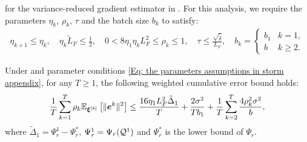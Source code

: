 for the variance-reduced gradient estimator in .
For this analysis, we require the parameters $\eta_{k}$, $\rho_{k}$, $\tau$ 
and the batch size $b_k$ to satisfy:
\begin{align}
    \label{Eq: the parameters assumptions in storm appendix}
    \eta_{k+1}\leq \eta_{k}, \quad \eta_{k}\tilde{L}_{F}\leq \frac{1}{2}, \quad 
    0 < 8\eta_{1}\eta_{k}L_{F}^{2}\leq \rho_{k}\leq1, \quad 
    \tau \leq \frac{\sqrt{\tilde{\delta}}}{L_{F}}, \quad
    b_k = \begin{cases} b_1 & k = 1, \\ b & k \geq 2. \end{cases}
\end{align}
\begin{lemma}
    \label{Lemma: Weighted error accumulation} Under 
    and parameter conditions \eqref{Eq: the parameters assumptions in storm appendix}, for any $T \geq 1$, the following weighted cumulative error bound
    holds:
    \begin{align}
        \label{Eq: weighted cumulative error bound}\frac{1}{T}\sum_{k=1}^{T}\rho_{k}\mathbb{E}_{\bm{\xi}^{[k]}}\left[ \| \bm{e}^{k}\|^{2}\right]\leq \frac{16 \eta_{1}L_{F}^{2}\tilde{\Delta}_{1}}{T}+ \frac{2\sigma^{2}}{Tb_{1}}+ \frac{1}{T}\sum_{k=2}^{T}\frac{4\rho_{k}^{2}\sigma^{2}}{b},
    \end{align} where $\tilde{\Delta}_{1}= \Psi_r^{1}- \Psi_r^{*}$, $\Psi_r^{1}= \Psi_r(\mathcal{Q}^{1})$ and $\Psi_r^{*}$ is the lower bound
of $\Psi_r$.
\end{lemma}
